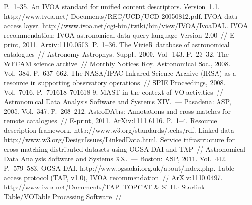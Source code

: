 \begin{multicols}{2}
{{\begin{thebibliography}{99}
 P.~1--35.
 An IVOA standard for unified content 
descriptors. Version~1.1. {\sf http://www.ivoa.net/ Documents/REC/UCD/UCD-20050812.pdf}.
IVOA data access layer. {\sf http://www.ivoa.net/cgi-bin/\linebreak twiki/bin/view/IVOA/IvoaDAL}.
 IVOA 
recommendation: IVOA astronomical data query language Version~2.00~// E-print, 2011. 
Arxiv:1110.0503. P.~1--36.
The VizieR database of astronomical catalogues~// 
Astronomy Astrophys. Suppl., 2000. Vol.~143. P.~23--32.
 The WFCAM 
science archive~// Monthly Notices Roy. Astronomical Soc., 2008. Vol.~384. P.~637--662.
 The NASA/IPAC Infrared Science Archive (IRSA) as a resource in 
supporting observatory operations~//  SPIE Proceedings, 2008. Vol.~7016. P.~701618--701618-9.
 MAST 
in the context of VO activities~// Astronomical Data Analysis Software and Systems XIV.~--- 
Pasadena: ASP, 2005. Vol.~347. P.~208--212.
AstroDAbis: Annotations and 
cross-matches for remote catalogues~// E-print, 2011. ArXiv:1111.6116. P.~1--4. 
Resource description framework. {\sf http://www.w3.org/\linebreak standards/techs/rdf}.
Linked data. {\sf http://www.w3.org/DesignIssues/\linebreak LinkedData.html}.
Service infrastructure for cross-matching distributed datasets using OGSA-DAI and TAP~// 
Astronomical Data Analysis Software and Systems XX.~--- Boston: ASP, 2011. Vol.~442. P.~579--583.
 OGSA-DAI. {\sf http://www.ogsadai.org.uk/about/\linebreak index.php}.
 Table access protocol (TAP, v1.0), IVOA recommendation~// 
ArXiv:1110.0497. {\sf http://www.ivoa.net/Documents/TAP}. 
TOPCAT \& STIL: Starlink Table/VOTable Processing Software~// 

\end{thebibliography}}}
\end{multicols}
